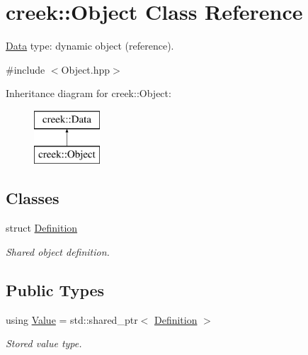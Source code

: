 \hypertarget{classcreek_1_1_object}{}\section{creek\+:\+:Object Class Reference}
\label{classcreek_1_1_object}


\hyperlink{classcreek_1_1_data}{Data} type\+: dynamic object (reference).  




{\ttfamily \#include $<$Object.\+hpp$>$}

Inheritance diagram for creek\+:\+:Object\+:\begin{figure}[H]
\begin{center}
\leavevmode
\includegraphics[height=2.000000cm]{classcreek_1_1_object}
\end{center}
\end{figure}
\subsection*{Classes}
\begin{DoxyCompactItemize}
\item 
struct \hyperlink{structcreek_1_1_object_1_1_definition}{Definition}
\begin{DoxyCompactList}\small\item\em Shared object definition. \end{DoxyCompactList}\end{DoxyCompactItemize}
\subsection*{Public Types}
\begin{DoxyCompactItemize}
\item 
using \hyperlink{classcreek_1_1_object_a108b9fdd2bfa34e220bf80cec8523313}{Value} = std\+::shared\+\_\+ptr$<$ \hyperlink{structcreek_1_1_object_1_1_definition}{Definition} $>$\hypertarget{classcreek_1_1_object_a108b9fdd2bfa34e220bf80cec8523313}{}\label{classcreek_1_1_object_a108b9fdd2bfa34e220bf80cec8523313}

\begin{DoxyCompactList}\small\item\em Stored value type. \end{DoxyCompactList}\end{DoxyCompactItemize}

